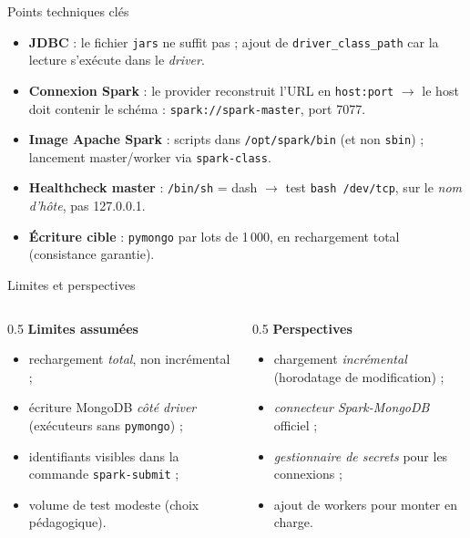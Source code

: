\documentclass[10pt]{beamer}
\begin{document}
\begin{frame}{Points techniques clés}
  \begin{itemize}
    \item \textbf{JDBC} : le fichier \texttt{jars} ne suffit pas ; ajout de
          \texttt{driver\_class\_path} car la lecture s'exécute dans le \emph{driver}.
    \item \textbf{Connexion Spark} : le provider reconstruit l'URL en
          \texttt{host:port} $\rightarrow$ le host doit contenir le schéma :
          \texttt{spark://spark-master}, port 7077.
    \item \textbf{Image Apache Spark} : scripts dans \texttt{/opt/spark/bin}
          (et non \texttt{sbin}) ; lancement master/worker via \texttt{spark-class}.
    \item \textbf{Healthcheck master} : \texttt{/bin/sh} = dash $\rightarrow$ test
          \texttt{bash /dev/tcp}, sur le \emph{nom d'hôte}, pas 127.0.0.1.
    \item \textbf{Écriture cible} : \texttt{pymongo} par lots de 1\,000, en
          rechargement total (consistance garantie).
  \end{itemize}
\end{frame}

\begin{frame}{Limites et perspectives}
  \begin{columns}
    \begin{column}{0.5\textwidth}
      \textbf{Limites assumées}
      \begin{itemize}
        \item rechargement \emph{total}, non incrémental ;
        \item écriture MongoDB \emph{côté driver} (exécuteurs sans \texttt{pymongo}) ;
        \item identifiants visibles dans la commande \texttt{spark-submit} ;
        \item volume de test modeste (choix pédagogique).
      \end{itemize}
    \end{column}
    \begin{column}{0.5\textwidth}
      \textbf{Perspectives}
      \begin{itemize}
        \item chargement \emph{incrémental} (horodatage de modification) ;
        \item \emph{connecteur Spark-MongoDB} officiel ;
        \item \emph{gestionnaire de secrets} pour les connexions ;
        \item ajout de workers pour monter en charge.
      \end{itemize}
    \end{column}
  \end{columns}
\end{frame}
\end{document}
